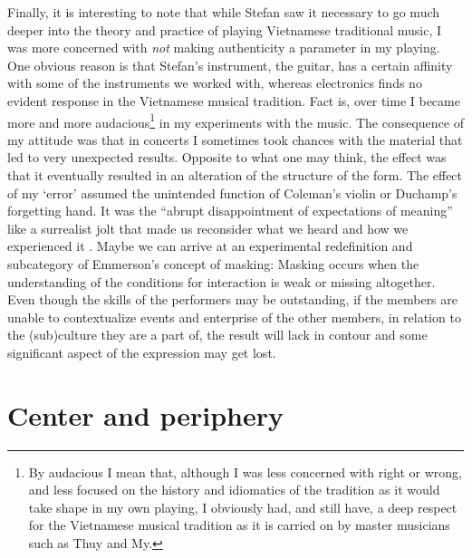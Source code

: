 \documentclass[a4paper]{article}
\begin{document}
Finally, it is interesting to note that while Stefan saw it necessary to go much deeper into the theory and practice of playing Vietnamese traditional music, I was more concerned with \emph{not} making authenticity a parameter in my playing. One obvious reason is that Stefan's instrument, the guitar, has a certain affinity with some of the instruments we worked with, whereas electronics finds no evident response in the Vietnamese musical tradition. Fact is, over time I became more and more audacious\footnote{By audacious I mean that, although I was less concerned with right or wrong, and less focused on the history and idiomatics of the tradition as it would take shape in my own playing, I obviously had, and still have, a deep respect for the Vietnamese musical tradition as it is carried on by master musicians such as Thuy and My.} in my experiments with the music. The consequence of my attitude was that in concerts I sometimes took chances with the material that led to very unexpected results. Opposite to what one may think, the effect was that it eventually resulted in an alteration of the structure of the form. The effect of my `error' assumed the unintended function of Coleman's violin or Duchamp's forgetting hand. It was the ``abrupt disappointment of expectations of meaning'' like a surrealist jolt that made us reconsider what we heard and how we experienced it \citep{barthes68:death_of}. Maybe we can arrive at an experimental redefinition and subcategory of Emmerson's concept of masking: Masking occurs when the understanding of the conditions for interaction is weak or missing altogether. Even though the skills of the performers may be outstanding, if the members are unable to contextualize events and enterprise of the other members, in relation to the (sub)culture they are a part of, the result will lack in contour and some significant aspect of the expression may get lost. 


\section*{Center and periphery}
\label{sec:center-periphery}
\end{document}
